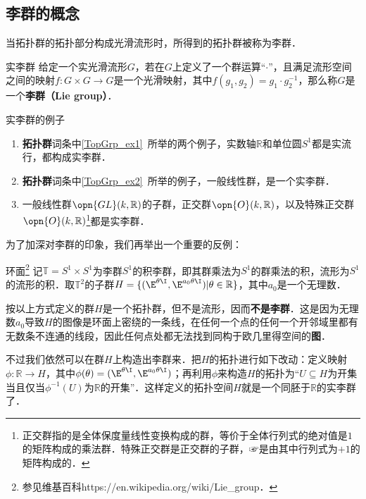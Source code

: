 

\subsection{李群的概念}

当拓扑群的拓扑部分构成光滑流形时，所得到的拓扑群被称为李群．

\begin{definition}{实李群}
给定一个实光滑流形$G$，若在$G$上定义了一个群运算“$\cdot$”，且满足流形空间之间的映射$f:G\times G\rightarrow G$是一个光滑映射，其中$f(g_1, g_2)=g_1\cdot g_2^{-1}$，那么称$G$是一个\textbf{李群（Lie group）}．
\end{definition}

\begin{example}{实李群的例子}
\begin{enumerate}
\item \textbf{拓扑群}词条中\autoref{TopGrp_ex1}~所举的两个例子，实数轴$\mathbb{R}$和单位圆$S^1$都是实流行，都构成实李群．
\item \textbf{拓扑群}词条中\autoref{TopGrp_ex2}~所举的例子，一般线性群，是一个实李群．
\item 一般线性群$\opn{GL}(k, \mathbb{R})$的子群，正交群$\opn{O}(k, \mathbb{R})$，以及特殊正交群$\opn{O}(k, \mathbb{R})$\footnote{正交群指的是全体保度量线性变换构成的群，等价于全体行列式的绝对值是$1$的矩阵构成的乘法群．特殊正交群是正交群的子群，☞是由其中行列式为$+1$的矩阵构成的．}都是实李群．
\end{enumerate}
\end{example}

为了加深对李群的印象，我们再举出一个重要的反例：

\begin{definition}{环面\footnote{参见维基百科https://en.wikipedia.org/wiki/Lie_group．}}
记$\mathbb{T}=S^1\times S^1$为李群$S^1$的积李群，即其群乘法为$S^1$的群乘法的积，流形为$S^1$的流形的积．取$\mathbb{T}^2$的子群$H=\{(\E^{\theta\I}, \E^{a_0\theta\I})|\theta\in\mathbb{R}\}$，其中$a_0$是一个无理数．

按以上方式定义的群$H$是一个拓扑群，但不是流形，因而\textbf{不是李群}．这是因为无理数$a_0$导致$H$的图像是环面上密绕的一条线，在任何一个点的任何一个开邻域里都有无数条不连通的线段，因此任何点处都无法找到同构于欧几里得空间的\textbf{图}．

不过我们依然可以在群$H$上构造出李群来．把$H$的拓扑进行如下改动：定义映射$\phi:\mathbb{R}\to H$，其中$\phi(\theta)=(\E^{\theta\I}, \E^{a_0\theta\I})$；再利用$\phi$来构造$H$的拓扑为“$U\subseteq H$为开集当且仅当$\phi^{-1}(U)$为$\mathbb{R}$的开集”．这样定义的拓扑空间$H$就是一个同胚于$\mathbb{R}$的实李群了．
\end{definition}






